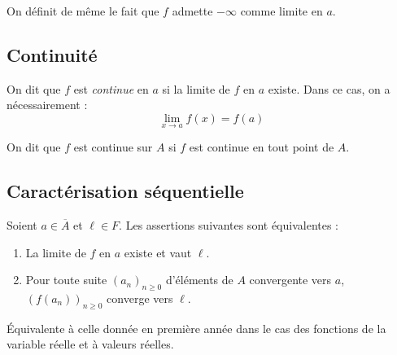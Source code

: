 \documentclass[french,11pt,twoside]{VcCours}
\begin{document}
\begin{Remarque}{} On définit de même le fait que $f$ admette $- \infty$ comme limite en $a$.
\end{Remarque}

\subsection{Continuité}

\begin{TheoremeDefinition}{} On dit que $f$ est \emph{continue} en $a$ si la limite de $f$ en $a$ existe. Dans ce cas, on a nécessairement :
$$ \lim_{x \rightarrow a} f(x) = f(a) $$
\end{TheoremeDefinition}

\begin{Definition}{} On dit que $f$ est continue sur $A$ si $f$ est continue en tout point de $A$.
\end{Definition}

\subsection{Caractérisation séquentielle}

\begin{Proposition}{} Soient $a \in \overline{A}$ et $\ell \in F$. Les assertions suivantes sont équivalentes :

\begin{enumerate}
\item La limite de $f$ en $a$ existe et vaut $\ell$.
\item Pour toute suite $(a_n)_{n \geq 0}$ d'éléments de $A$ convergente vers $a$, $(f(a_n))_{n \geq 0}$ converge vers $\ell$.
\end{enumerate}
\end{Proposition}

\begin{Demonstration}{} Équivalente à celle donnée en première année dans le cas des fonctions de la variable réelle et à valeurs réelles.
\end{Demonstration}
\end{document}
